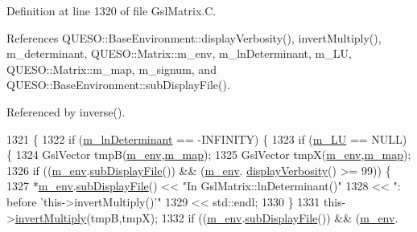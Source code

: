 Definition at line 1320 of file Gsl\-Matrix.\-C.



References Q\-U\-E\-S\-O\-::\-Base\-Environment\-::display\-Verbosity(), invert\-Multiply(), m\-\_\-determinant, Q\-U\-E\-S\-O\-::\-Matrix\-::m\-\_\-env, m\-\_\-ln\-Determinant, m\-\_\-\-L\-U, Q\-U\-E\-S\-O\-::\-Matrix\-::m\-\_\-map, m\-\_\-signum, and Q\-U\-E\-S\-O\-::\-Base\-Environment\-::sub\-Display\-File().



Referenced by inverse().


\begin{DoxyCode}
1321 \{
1322   \textcolor{keywordflow}{if} (\hyperlink{class_q_u_e_s_o_1_1_gsl_matrix_a22b386a1106b9a583edea11bccf15cb9}{m\_lnDeterminant} == -INFINITY) \{
1323     \textcolor{keywordflow}{if} (\hyperlink{class_q_u_e_s_o_1_1_gsl_matrix_ada9c659bda4c71273af34e79eba4ec81}{m\_LU} == NULL) \{
1324       GslVector tmpB(\hyperlink{class_q_u_e_s_o_1_1_matrix_a247fb0fc0b87fecdee054bb4660b68e8}{m\_env},\hyperlink{class_q_u_e_s_o_1_1_matrix_adb42d344c0b2859c3b4a4f5a3dd7875f}{m\_map});
1325       GslVector tmpX(\hyperlink{class_q_u_e_s_o_1_1_matrix_a247fb0fc0b87fecdee054bb4660b68e8}{m\_env},\hyperlink{class_q_u_e_s_o_1_1_matrix_adb42d344c0b2859c3b4a4f5a3dd7875f}{m\_map});
1326       \textcolor{keywordflow}{if} ((\hyperlink{class_q_u_e_s_o_1_1_matrix_a247fb0fc0b87fecdee054bb4660b68e8}{m\_env}.\hyperlink{class_q_u_e_s_o_1_1_base_environment_a8a0064746ae8dddfece4229b9ad374d6}{subDisplayFile}()) && (\hyperlink{class_q_u_e_s_o_1_1_matrix_a247fb0fc0b87fecdee054bb4660b68e8}{m\_env}.
      \hyperlink{class_q_u_e_s_o_1_1_base_environment_a1fe5f244fc0316a0ab3e37463f108b96}{displayVerbosity}() >= 99)) \{
1327         *\hyperlink{class_q_u_e_s_o_1_1_matrix_a247fb0fc0b87fecdee054bb4660b68e8}{m\_env}.\hyperlink{class_q_u_e_s_o_1_1_base_environment_a8a0064746ae8dddfece4229b9ad374d6}{subDisplayFile}() << \textcolor{stringliteral}{"In GslMatrix::lnDeterminant()"}
1328                                 << \textcolor{stringliteral}{": before 'this->invertMultiply()'"}
1329                                 << std::endl;
1330       \}
1331       this->\hyperlink{class_q_u_e_s_o_1_1_gsl_matrix_a2eea3056f561ffeaee754b71cfcfa27e}{invertMultiply}(tmpB,tmpX);
1332       \textcolor{keywordflow}{if} ((\hyperlink{class_q_u_e_s_o_1_1_matrix_a247fb0fc0b87fecdee054bb4660b68e8}{m\_env}.\hyperlink{class_q_u_e_s_o_1_1_base_environment_a8a0064746ae8dddfece4229b9ad374d6}{subDisplayFile}()) && (\hyperlink{class_q_u_e_s_o_1_1_matrix_a247fb0fc0b87fecdee054bb4660b68e8}{m\_env}.

\end{DoxyCode}
